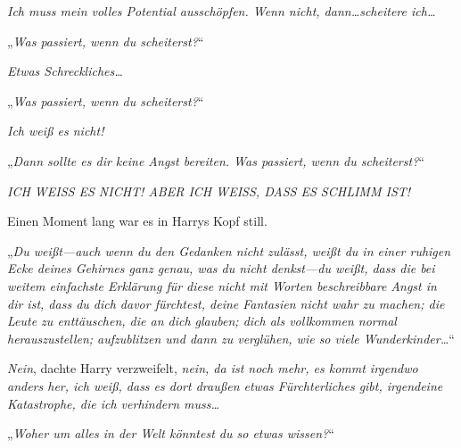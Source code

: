 \emph{Ich muss mein volles Potential ausschöpfen. Wenn nicht, dann…scheitere ich…}

„\emph{Was passiert, wenn du scheiterst?}“

\emph{Etwas Schreckliches…}

„\emph{Was passiert, wenn du scheiterst?}“

\emph{Ich weiß es nicht! }

„\emph{Dann sollte es dir keine Angst bereiten. Was passiert, wenn du scheiterst?}“

\emph{ICH WEISS ES NICHT! ABER ICH WEISS, DASS ES SCHLIMM IST!}

Einen Moment lang war es in Harrys Kopf still.

„\emph{Du weißt—auch wenn du den Gedanken nicht zulässt, weißt du in einer ruhigen Ecke deines Gehirnes ganz genau, was du nicht denkst—du \emph{weißt}, dass die bei weitem einfachste Erklärung für diese nicht mit Worten beschreibbare Angst in dir ist, dass du dich davor fürchtest, deine Fantasien nicht wahr zu machen; die Leute zu enttäuschen, die an dich glauben; dich als vollkommen normal herauszustellen; aufzublitzen und dann zu verglühen, wie so viele Wunderkinder…}“

\emph{Nein}, dachte Harry verzweifelt, \emph{nein, da ist noch mehr, es kommt irgendwo anders her, ich weiß, dass es dort draußen etwas Fürchterliches gibt, irgendeine Katastrophe, die ich verhindern muss…}

„\emph{Woher um alles in der Welt könntest du so etwas wissen?}“

